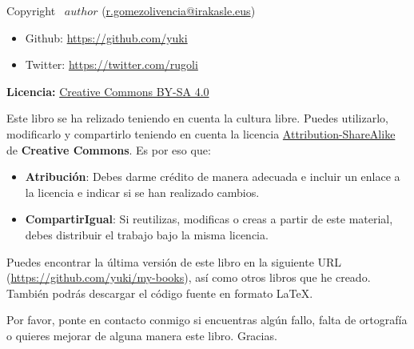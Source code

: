 \documentclass[11pt,titlepage,twoside,openany]{book}
\newenvironment{custombox}[4]{
  \begin{tcolorbox}[
      colframe=#1, colbacktitle=#1,
      colupper=#1, colback=#2,
      enhanced, sidebyside, segmentation hidden,
      lefthand width=1.2cm,
      title=\textbf{#3},]
    \centering
    \color{#1}
    \fontsize{30pt}{-10pt}#4
    \tcblower
    \color{#1}
}{
  \end{tcolorbox}
}
\newenvironment{infobox}{
  \begin{custombox}{cyan!60!black}{cyan!5!white}{Información}{\faInfoCircle}
}{
  \end{custombox}
}
\begin{document}
\null
\vfill
\begin{flushleft}
    

    Copyright \textcopyright \ $author$ \hspace{1pt} (\href{mailto:me@somewhere.com}{r.gomezolivencia@irakasle.eus})
    \begin{itemize}
        \item Github: \href{https://github.com/yuki}{https://github.com/yuki}
        \item Twitter: \href{https://twitter.com/rugoli}{https://twitter.com/rugoli}
    \end{itemize}


    \vspace{5mm}
    \textbf{Licencia: } \href{https://creativecommons.org/licenses/by-sa/4.0/deed.es}{Creative Commons BY-SA 4.0}


    Este libro se ha relizado teniendo en cuenta la cultura libre. Puedes utilizarlo, modificarlo y compartirlo teniendo en cuenta la licencia \href{https://creativecommons.org/licenses/by-sa/4.0/}{Attribution-ShareAlike} de \textbf{Creative Commons}. Es por eso que:

    \begin{itemize}
        \item \textbf{Atribución}: Debes darme crédito de manera adecuada e incluir un enlace a la licencia e indicar si se han realizado cambios.
        \item \textbf{CompartirIgual}: Si reutilizas, modificas o creas a partir de este material, debes distribuir el trabajo bajo la misma licencia.
    \end{itemize}


    Puedes encontrar la última versión de este libro en la siguiente URL (\href{https://github.com/yuki/my-books}{https://github.com/yuki/my-books}), así como otros libros que he creado. También podrás descargar el código fuente en formato \LaTeX{}.

    \begin{infobox}
        Por favor, ponte en contacto conmigo si encuentras algún fallo, falta de ortografía o quieres mejorar de alguna manera este libro. Gracias.
    \end{infobox}
    \vspace{5mm}
\end{flushleft}

\clearpage %


\end{document}
